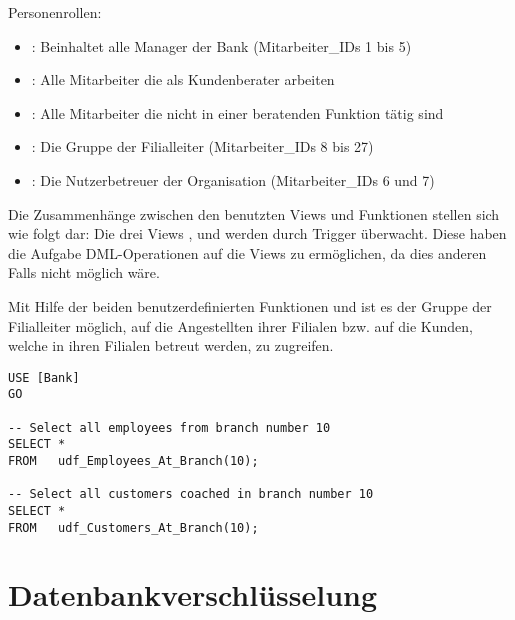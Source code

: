           Personenrollen:
          \begin{itemize}
            \item {}: Beinhaltet alle Manager der Bank
            (Mitarbeiter\_IDs 1 bis 5)
            \item {}: Alle Mitarbeiter die
            als Kundenberater arbeiten
            \item {}: Alle Mitarbeiter die nicht in
            einer beratenden Funktion tätig sind
            \item {}: Die Gruppe der
            Filialleiter (Mitarbeiter\_IDs 8 bis 27)
            \item {}: Die Nutzerbetreuer der
            Organisation (Mitarbeiter\_IDs 6 und 7)
          \end{itemize}
          Die Zusammenhänge zwischen den benutzten Views und Funktionen stellen
          sich wie folgt dar:
          Die drei Views , 
          und  werden durch Trigger überwacht.
          Diese haben die Aufgabe DML-Operationen auf die Views zu ermöglichen,
          da dies anderen Falls nicht möglich wäre.
          
          Mit Hilfe der beiden benutzerdefinierten Funktionen
           und
           ist es der Gruppe der
          Filialleiter möglich, auf die Angestellten ihrer Filialen bzw. auf die
          Kunden, welche in ihren Filialen betreut werden, zu zugreifen.
          \begin{lstlisting}[language=ms_sql,caption={Selektieren
          aus einer User Defined Table-function},label=sql19_25]
USE [Bank]
GO

-- Select all employees from branch number 10
SELECT *
FROM   udf_Employees_At_Branch(10);

-- Select all customers coached in branch number 10
SELECT *
FROM   udf_Customers_At_Branch(10);
          \end{lstlisting}
    \section{Datenbankverschlüsselung}
